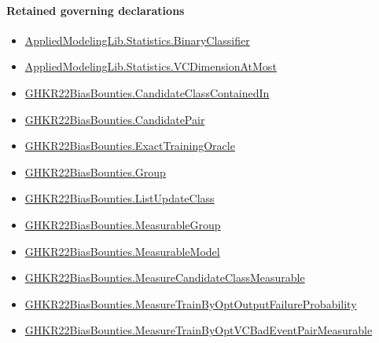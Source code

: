 \documentclass[10pt]{article}
\begin{document}
\paragraph{Retained governing declarations}
\begin{itemize}\raggedright
\item \hyperlink{governing-declaration-cb3af244ff388b59}{Applied\allowbreak{}Modeling\allowbreak{}Lib.\allowbreak{}Statistics.\allowbreak{}Binary\allowbreak{}Classifier}
\item \hyperlink{governing-declaration-bef3cff7f5ca4668}{Applied\allowbreak{}Modeling\allowbreak{}Lib.\allowbreak{}Statistics.\allowbreak{}VC\allowbreak{}Dimension\allowbreak{}At\allowbreak{}Most}
\item \hyperlink{governing-declaration-c7a168460428c219}{GHKR22\allowbreak{}Bias\allowbreak{}Bounties.\allowbreak{}Candidate\allowbreak{}Class\allowbreak{}Contained\allowbreak{}In}
\item \hyperlink{governing-declaration-373b79d2a57e81fc}{GHKR22\allowbreak{}Bias\allowbreak{}Bounties.\allowbreak{}Candidate\allowbreak{}Pair}
\item \hyperlink{governing-declaration-167e68f82f14fb88}{GHKR22\allowbreak{}Bias\allowbreak{}Bounties.\allowbreak{}Exact\allowbreak{}Training\allowbreak{}Oracle}
\item \hyperlink{paper-prerequisite-cc7214115b27106f}{GHKR22\allowbreak{}Bias\allowbreak{}Bounties.\allowbreak{}Group}
\item \hyperlink{governing-declaration-cce66ae9079d8b67}{GHKR22\allowbreak{}Bias\allowbreak{}Bounties.\allowbreak{}List\allowbreak{}Update\allowbreak{}Class}
\item \hyperlink{governing-declaration-8d5012d60e076f7c}{GHKR22\allowbreak{}Bias\allowbreak{}Bounties.\allowbreak{}Measurable\allowbreak{}Group}
\item \hyperlink{governing-declaration-8b721c00962c326a}{GHKR22\allowbreak{}Bias\allowbreak{}Bounties.\allowbreak{}Measurable\allowbreak{}Model}
\item \hyperlink{governing-declaration-b6bcc8193f1bf8df}{GHKR22\allowbreak{}Bias\allowbreak{}Bounties.\allowbreak{}Measure\allowbreak{}Candidate\allowbreak{}Class\allowbreak{}Measurable}
\item \hyperlink{governing-declaration-15ff4384f8db9ceb}{GHKR22\allowbreak{}Bias\allowbreak{}Bounties.\allowbreak{}Measure\allowbreak{}Train\allowbreak{}By\allowbreak{}Opt\allowbreak{}Output\allowbreak{}Failure\allowbreak{}Probability}
\item \hyperlink{governing-declaration-de913715929c5948}{GHKR22\allowbreak{}Bias\allowbreak{}Bounties.\allowbreak{}Measure\allowbreak{}Train\allowbreak{}By\allowbreak{}Opt\allowbreak{}VC\allowbreak{}Bad\allowbreak{}Event\allowbreak{}Pair\allowbreak{}Measurable}

\end{itemize}
\end{document}
